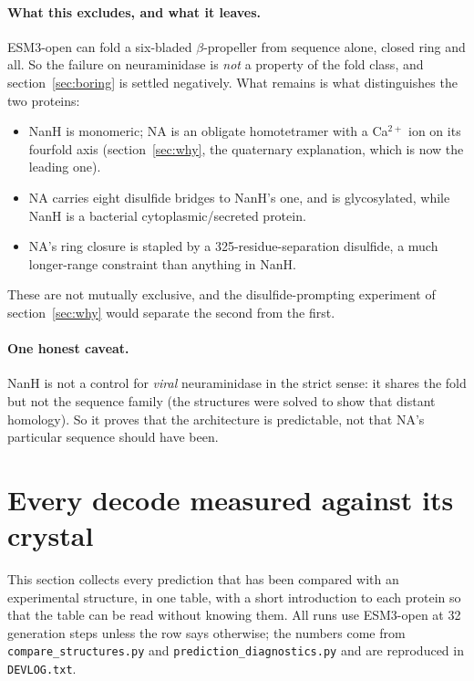 \documentclass[11pt,a4paper]{article}
\newcommand{\file}[1]{\texttt{#1}}
\begin{document}
\paragraph{What this excludes, and what it leaves.} ESM3-open can fold a
six-bladed $\beta$-propeller from sequence alone, closed ring and all. So the
failure on neuraminidase is \emph{not} a property of the fold class, and
section~\ref{sec:boring} is settled negatively. What remains is what distinguishes
the two proteins:
\begin{itemize}
  \item NanH is monomeric; NA is an obligate homotetramer with a Ca$^{2+}$ ion on
        its fourfold axis (section~\ref{sec:why}, the quaternary explanation,
        which is now the leading one).
  \item NA carries eight disulfide bridges to NanH's one, and is glycosylated,
        while NanH is a bacterial cytoplasmic/secreted protein.
  \item NA's ring closure is stapled by a 325-residue-separation disulfide, a
        much longer-range constraint than anything in NanH.
\end{itemize}
These are not mutually exclusive, and the disulfide-prompting experiment of
section~\ref{sec:why} would separate the second from the first.

\paragraph{One honest caveat.} NanH is not a control for \emph{viral}
neuraminidase in the strict sense: it shares the fold but not the sequence family
(the structures were solved to show that distant homology). So it proves that the
architecture is predictable, not that NA's particular sequence should have been.

\section{Every decode measured against its crystal}\label{sec:alltargets}

This section collects every prediction that has been compared with an
experimental structure, in one table, with a short introduction to each protein
so that the table can be read without knowing them. All runs use ESM3-open at 32
generation steps unless the row says otherwise; the numbers come from
\file{compare\_structures.py} and \file{prediction\_diagnostics.py} and are
reproduced in \file{DEVLOG.txt}.
\end{document}
